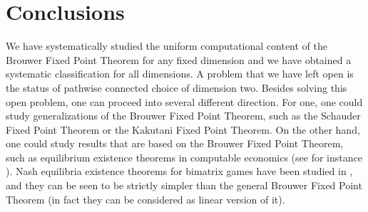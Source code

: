 \documentclass[a4paper]{amsart}
\theoremstyle{definition}
\begin{document}
\section{Conclusions}
\label{sec:conclusions}

We have systematically studied the uniform computational content of the Brouwer Fixed Point Theorem
for any fixed dimension and we have obtained a systematic classification for all dimensions. 
A problem that we have left open is the status of pathwise connected choice of dimension two.
Besides solving this open problem, one can proceed into several different direction.
For one, one could study generalizations of the Brouwer Fixed Point Theorem, such as
the Schauder Fixed Point Theorem or the Kakutani Fixed Point Theorem.
On the other hand, one could study results that are based on the Brouwer Fixed Point Theorem,
such as equilibrium existence theorems in computable economics (see for instance \cite{RW99a}).
Nash equilibria existence theorems for bimatrix games have been studied in \cite{Pau10},
and they can be seen to be strictly simpler than
the general Brouwer Fixed Point Theorem (in fact they can be considered as linear version of it).





%
\end{document}
